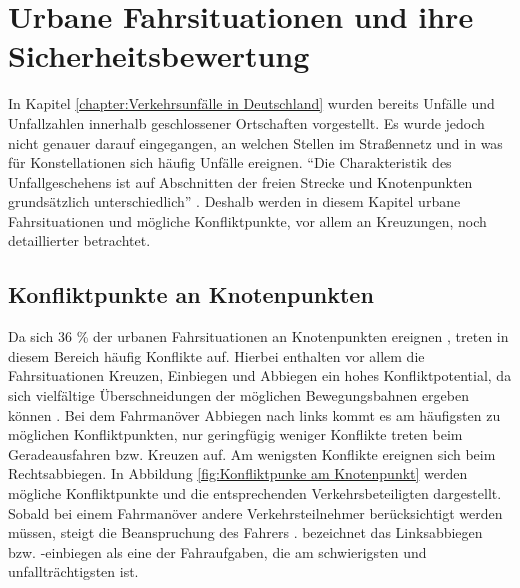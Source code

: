 \section{Urbane Fahrsituationen und ihre Sicherheitsbewertung}\label{section:urbane Fahrsituationen und ihre Sicherheitsbewertung}
In Kapitel \ref{chapter:Verkehrsunfälle in Deutschland} wurden bereits Unfälle und Unfallzahlen innerhalb geschlossener Ortschaften vorgestellt. Es wurde jedoch nicht genauer darauf eingegangen, an welchen Stellen im Straßennetz und in was für Konstellationen sich häufig Unfälle ereignen. \enquote{Die Charakteristik des Unfallgeschehens ist auf Abschnitten der freien Strecke und Knotenpunkten grundsätzlich unterschiedlich} \parencite[S. 83]{Aurich.2015}. Deshalb werden in diesem Kapitel urbane Fahrsituationen und mögliche Konfliktpunkte, vor allem an Kreuzungen, noch detaillierter betrachtet.

\subsection{Konfliktpunkte an Knotenpunkten}\label{subsection:Konfliktpunkte an Knotenpunkten}
Da sich 36 \% der urbanen Fahrsituationen an Knotenpunkten ereignen \parencite[S. 40]{Gerstenberger.17.02.2015}, treten in diesem Bereich häufig Konflikte auf. Hierbei enthalten vor allem die Fahrsituationen Kreuzen, Einbiegen und Abbiegen ein hohes Konfliktpotential, da sich vielfältige Überschneidungen der möglichen Bewegungsbahnen ergeben können \parencite[S. 83]{Reichart.2001}. Bei dem Fahrmanöver Abbiegen nach links kommt es am häufigsten zu möglichen Konfliktpunkten, nur geringfügig weniger Konflikte treten beim Geradeausfahren bzw. Kreuzen auf. Am wenigsten Konflikte ereignen sich beim Rechtsabbiegen. In Abbildung \ref{fig:Konfliktpunke am Knotenpunkt} werden mögliche Konfliktpunkte und die entsprechenden Verkehrsbeteiligten dargestellt. Sobald bei einem Fahrmanöver andere Verkehrsteilnehmer berücksichtigt werden müssen, steigt die Beanspruchung des Fahrers \parencite[S. 9]{Mages.2008}. \Textcite[S. 84]{Reichart.2001} bezeichnet das Linksabbiegen bzw. -einbiegen als eine der Fahraufgaben, die am schwierigsten und unfallträchtigsten ist.

